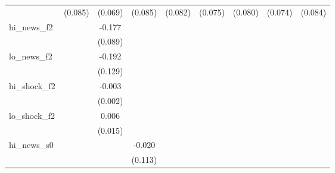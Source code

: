 {\begin{tabular}{l*{8}{c}}
            &     (0.085)         &     (0.069)         &     (0.085)         &     (0.082)         &     (0.075)         &     (0.080)         &     (0.074)         &     (0.084)         \\
\addlinespace
hi\_news\_f2  &                     &      -0.177\sym{*}  &                     &                     &                     &                     &                     &                     \\
            &                     &     (0.089)         &                     &                     &                     &                     &                     &                     \\
\addlinespace
lo\_news\_f2  &                     &      -0.192         &                     &                     &                     &                     &                     &                     \\
            &                     &     (0.129)         &                     &                     &                     &                     &                     &                     \\
\addlinespace
hi\_shock\_f2 &                     &      -0.003         &                     &                     &                     &                     &                     &                     \\
            &                     &     (0.002)         &                     &                     &                     &                     &                     &                     \\
\addlinespace
lo\_shock\_f2 &                     &       0.006         &                     &                     &                     &                     &                     &                     \\
            &                     &     (0.015)         &                     &                     &                     &                     &                     &                     \\
\addlinespace
hi\_news\_s0  &                     &                     &      -0.020         &                     &                     &                     &                     &                     \\
            &                     &                     &     (0.113)         &                     &                     &                     &                     &                     \\

\end{tabular}}
